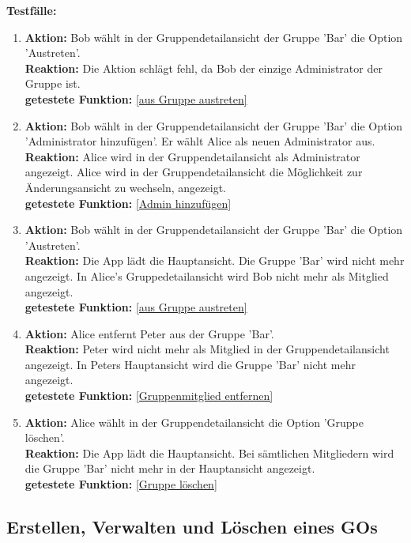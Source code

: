 \documentclass[parskip=full]{scrartcl}
\def\threedigits#1{%
  \ifnum#1<100 0\fi
  \ifnum#1<10 0\fi
  \number#1}
\begin{document}
\textbf{Testfälle:}
\begin{enumerate}[label={\textbf{/T\protect\threedigits{\theenumi}0/}}, leftmargin=*, resume]
	\item \textbf{Aktion:} Bob wählt in der Gruppendetailansicht der Gruppe 'Bar' die Option 'Austreten'. \\
	\textbf{Reaktion:} Die Aktion schlägt fehl, da Bob der einzige Administrator der Gruppe ist.\\
	\textbf{getestete Funktion:} \ref{aus Gruppe austreten}
	\item \textbf{Aktion:} Bob wählt in der Gruppendetailansicht der Gruppe 'Bar' die Option 'Administrator hinzufügen'. Er wählt Alice als neuen Administrator aus.\\
	\textbf{Reaktion:} Alice wird in der Gruppendetailansicht als Administrator angezeigt. Alice wird in der Gruppendetailansicht die Möglichkeit zur Änderungsansicht zu wechseln, angezeigt.\\
	\textbf{getestete Funktion:} \ref{Admin hinzufügen}
	\item \textbf{Aktion:} Bob wählt in der Gruppendetailansicht der Gruppe 'Bar' die Option 'Austreten'.\\
	\textbf{Reaktion:} Die App lädt die Hauptansicht. Die Gruppe 'Bar' wird nicht mehr angezeigt. In Alice's Gruppedetailansicht wird Bob nicht mehr als Mitglied angezeigt.\\
	\textbf{getestete Funktion:} \ref{aus Gruppe austreten}
	\item \textbf{Aktion:} Alice entfernt Peter aus der Gruppe 'Bar'.\\
	\textbf{Reaktion:} Peter wird nicht mehr als Mitglied in der Gruppendetailansicht angezeigt. In Peters Hauptansicht wird die Gruppe 'Bar' nicht mehr angezeigt.\\
	\textbf{getestete Funktion:} \ref{Gruppenmitglied entfernen}
	\item \textbf{Aktion:} Alice wählt in der Gruppendetailansicht die Option 'Gruppe löschen'.\\
	\textbf{Reaktion:} Die App lädt die Hauptansicht. Bei sämtlichen Mitgliedern wird die Gruppe 'Bar' nicht mehr in der Hauptansicht angezeigt.\\
	\textbf{getestete Funktion:} \ref{Gruppe löschen}
\end{enumerate}

\subsection{Erstellen, Verwalten und Löschen eines GOs}
\end{document}
